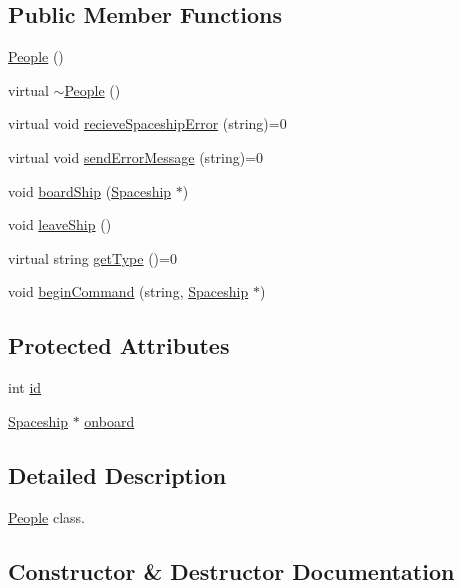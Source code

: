 \subsection*{Public Member Functions}
\begin{DoxyCompactItemize}
\item 
\hyperlink{classPeople_aae1408eddfd15a5007003ecdf1507941}{People} ()
\item 
virtual \hyperlink{classPeople_a26b0c041fafa38a1f84e0d51742e886a}{$\sim$\+People} ()
\item 
virtual void \hyperlink{classPeople_a0685df78be631783138865e03cc7c85d}{recieve\+Spaceship\+Error} (string)=0
\item 
virtual void \hyperlink{classPeople_a572a35170f61d1848eb04b65baafb057}{send\+Error\+Message} (string)=0
\item 
void \hyperlink{classPeople_a66c99da939fe89614360953a3619a271}{board\+Ship} (\hyperlink{classSpaceship}{Spaceship} $\ast$)
\item 
void \hyperlink{classPeople_a5e87ed1cfd4d4d90b95e3b2196c7687e}{leave\+Ship} ()
\item 
virtual string \hyperlink{classPeople_af60dd882d60cddf63f9b95815ce551a8}{get\+Type} ()=0
\item 
void \hyperlink{classPeople_abf8a17cdc24354a5163d212a77312873}{begin\+Command} (string, \hyperlink{classSpaceship}{Spaceship} $\ast$)
\end{DoxyCompactItemize}
\subsection*{Protected Attributes}
\begin{DoxyCompactItemize}
\item 
int \hyperlink{classPeople_ab8216a756c93da727d2626dfb063f82a}{id}
\item 
\hyperlink{classSpaceship}{Spaceship} $\ast$ \hyperlink{classPeople_a103de9b80f0b47e01dc24ac48ec301b2}{onboard}
\end{DoxyCompactItemize}


\subsection{Detailed Description}
\hyperlink{classPeople}{People} class. 

\subsection{Constructor \& Destructor Documentation}
\mbox{\label{classPeople_aae1408eddfd15a5007003ecdf1507941}} 

